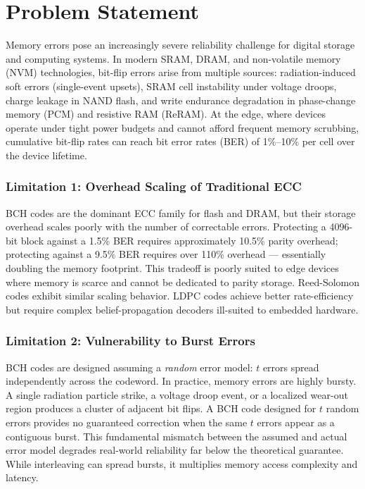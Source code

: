 \chapter*{Problem Statement}
\noindent
Memory errors pose an increasingly severe reliability challenge for digital storage and computing systems.
In modern SRAM, DRAM, and non-volatile memory (NVM) technologies, bit-flip errors arise from multiple sources: radiation-induced soft errors (single-event upsets), SRAM cell instability under voltage droops, charge leakage in NAND flash, and write endurance degradation in phase-change memory (PCM) and resistive RAM (ReRAM).
At the edge, where devices operate under tight power budgets and cannot afford frequent memory scrubbing, cumulative bit-flip rates can reach bit error rates (BER) of 1\%--10\% per cell over the device lifetime.

\subsection*{Limitation 1: Overhead Scaling of Traditional ECC}

BCH codes are the dominant ECC family for flash and DRAM, but their storage overhead scales poorly with the number of correctable errors.
Protecting a 4096-bit block against a 1.5\% BER requires approximately 10.5\% parity overhead; protecting against a 9.5\% BER requires over 110\% overhead --- essentially doubling the memory footprint.
This tradeoff is poorly suited to edge devices where memory is scarce and cannot be dedicated to parity storage.
Reed-Solomon codes exhibit similar scaling behavior.
LDPC codes achieve better rate-efficiency but require complex belief-propagation decoders ill-suited to embedded hardware.

\subsection*{Limitation 2: Vulnerability to Burst Errors}

BCH codes are designed assuming a \emph{random} error model: $t$ errors spread independently across the codeword.
In practice, memory errors are highly bursty.
A single radiation particle strike, a voltage droop event, or a localized wear-out region produces a cluster of adjacent bit flips.
A BCH code designed for $t$ random errors provides no guaranteed correction when the same $t$ errors appear as a contiguous burst.
This fundamental mismatch between the assumed and actual error model degrades real-world reliability far below the theoretical guarantee.
While interleaving can spread bursts, it multiplies memory access complexity and latency.

